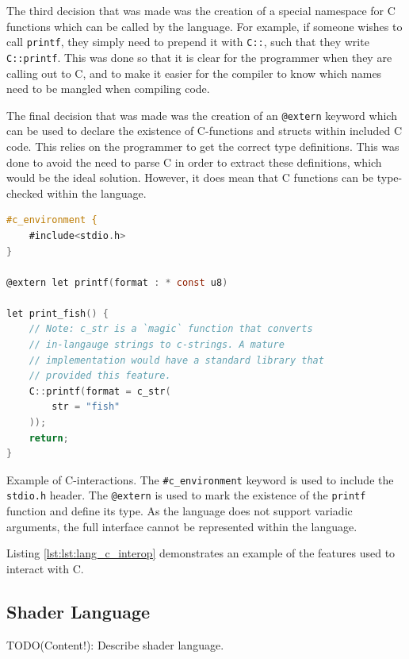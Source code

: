 \documentclass[a4paper,12pt,twoside,openright]{report}
\begin{document}
The third decision that was made was the creation of a special namespace for C
functions which can be called by the language. For example, if someone wishes
to call \texttt{printf}, they simply need to prepend it with \texttt{C::}, such
that they write \texttt{C::printf}. This was done so that it is clear for the
programmer when they are calling out to C, and to make it easier for the
compiler to know which names need to be mangled when compiling code.

The final decision that was made was the creation of an \texttt{@extern}
keyword which can be used to declare the existence of C-functions and structs
within included C code. This relies on the programmer to get the correct type
definitions. This was done to avoid the need to parse C in order to extract
these definitions, which would be the ideal solution. However, it does mean
that C functions can be type-checked within the language.


\begin{lstfloat}
\begin{lstlisting}[language=C]
#c_environment {
    #include<stdio.h>
}

@extern let printf(format : * const u8)

let print_fish() {
    // Note: c_str is a `magic` function that converts
    // in-langauge strings to c-strings. A mature
    // implementation would have a standard library that
    // provided this feature.
    C::printf(format = c_str(
        str = "fish"
    ));
    return;
}
\end{lstlisting}
\label{lst:lang_c_interop}

\caption{Example of C-interactions. The \texttt{\#c\_environment} keyword is
used to include the \texttt{stdio.h} header. The \texttt{@extern} is used to
mark the existence of the \texttt{printf} function and define its type. As the
language does not support variadic arguments, the full interface cannot be
represented within the language.}

\end{lstfloat}

Listing \ref{lst:lst:lang_c_interop} demonstrates an example of the features
used to interact with C.

\subsection{Shader Language}

TODO(Content!): Describe shader language.
\end{document}
